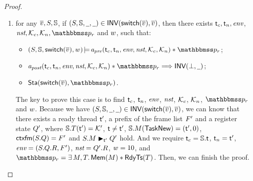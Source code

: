\begin{proof}
\begin{enumerate}
        \item for any $\overline{v}, S, \mathbb{S}$, 
        if $(S, \mathbb{S}, \underline{\ \,}, \underline{\ \,}) \in 
            \textsf{INV}{(\mathsf{switch}(\overline{v}), \overline{v})}$, 
        then there exists $\textsf{t}_c, \textsf{t}_n, \textit{env}$, $\nst, 
        \hthrdlocalst_c, \hthrdlocalst_n, \relastP_r$ and $w$, 
        such that:
        \begin{itemize}
            \item $\asrtmodel{(\state, \hpstate, \primsw(\args{\val}), \word)}
                {\Apre(\thrdid_c, \thrdid_n, \env, \nst, \hthrdlocalst_c, 
                \hthrdlocalst_n) \sepstar \relastP_r}$; 
            \item  $\Apost(\thrdid_c, \thrdid_n, \env, \nst, \hthrdlocalst_c, 
                \hthrdlocalst_n) \sepstar \relastP_r \Longrightarrow 
                \INV{(\primdone, \notCare)}$; 
            \item $\Sta(\primsw(\args{\val}), \relastP_r)$. 
        \end{itemize}
        \vspace*{0.3em}
        The key to prove this case is to find $\textsf{t}_c$, $\textsf{t}_n$, $\textit{env}$, 
        $\textit{nst}$, $\mathcal{K}_c$, $\mathcal{K}_n$, $\relastP_r$ and $w$. 
        Because we have $(S, \mathbb{S}, \underline{\ \,}, \underline{\ \,}) \in 
            \textsf{INV}{(\mathsf{switch}(\overline{v}), \overline{v})}$, we can know that there exists 
        a ready thread $\textsf{t}'$, a prefix of the frame list $F'$ 
        and a register state $Q'$, where 
        $\mathbb{S}.T(\textsf{t}') = \mathcal{K}'$, 
        $\textsf{t} \neq \textsf{t}'$, $\mathbb{S}.M(\mathsf{TaskNew}) = (\textsf{t}', 0)$, 
        $\textsf{ctxfm}(S.Q) = F'$ 
        and ${S.M} \blacktriangleright_{\textsf{t}'} {Q'}$ hold. 
        And we require $\textsf{t}_c = \mathbb{S}.\textsf{t}$, $\textsf{t}_n = \textsf{t}'$, 
        $\textit{env} = (S.Q.R, F')$, $\textit{nst} = Q'.R$, $w = 10$, 
        and $\relastP_r = \exists \, \Mem, \thrdpool. \, \MemRAsrt{\Mem}
        \sepstar \RdyTsRAsrt{\thrdpool}$. Then, we can finish 
        the proof. 


\end{enumerate}
\end{proof}
